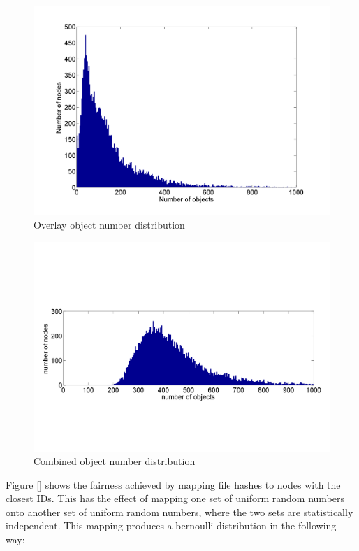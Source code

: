 \documentclass[10pt,a4paper,conference]{IEEEtran}
\begin{document}
\begin{figure}[htbp]
 \centering
 \includegraphics[clip=true, viewport=1.5cm 1.2cm 27cm 19.7cm, width=\columnwidth]{OverlayObjects}
 \caption{Overlay object number distribution}
 \label{fig_pithos_response}
\end{figure}

\begin{figure}[htbp]
 \centering
 \includegraphics[clip=true, viewport=1.5cm 1.2cm 27cm 19.7cm, width=\columnwidth]{Objects}
 \caption{Combined object number distribution}
 \label{fig_pithos_response}
\end{figure}

Figure \ref{} shows the fairness achieved by mapping file hashes to nodes with the closest IDs. This has the effect of mapping one set of uniform
random numbers onto another set of uniform random numbers, where the two sets are statistically independent. This mapping produces a bernoulli
distribution in the following way:
\end{document}
